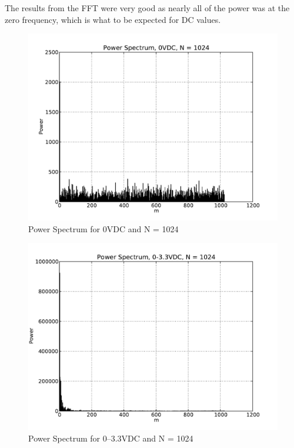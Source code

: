 \documentclass[10pt,conference]{IEEEtran}
\begin{document}
The results from the FFT were very good as nearly all of the power was at the zero frequency, which is what to be expected for DC values.
\begin{figure}[ht]
	\includegraphics[scale=.50]{power_spectrum_0_1024}
	\caption{Power Spectrum for 0VDC and N = 1024}\label{power_spectrum_0_1024}
\end{figure}
\begin{figure}[ht]
	\includegraphics[scale=.50]{power_spectrum_0_33_1024}
	\caption{Power Spectrum for 0--3.3VDC and N = 1024}\label{power_spectrum_0_33_1024}
\end{figure}
\end{document}
